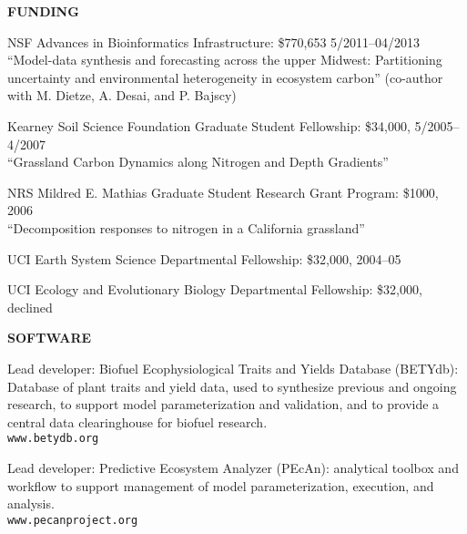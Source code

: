 \documentclass[10pt,twoside]{article}
\begin{document}
\textbf{FUNDING}
\begin{itemize*}
\item NSF Advances in Bioinformatics Infrastructure: \$770,653 5/2011--04/2013\\
``Model-data synthesis and forecasting across the upper Midwest: Partitioning uncertainty and environmental heterogeneity in ecosystem carbon''  (co-author with M. Dietze, A. Desai, and P. Bajscy)
  
\item Kearney Soil Science Foundation Graduate Student Fellowship:  \$34,000, 5/2005--4/2007 \\ 
``Grassland Carbon Dynamics along Nitrogen and Depth Gradients'' 
\item NRS Mildred E. Mathias Graduate Student Research Grant Program: \$1000, 2006 \\
``Decomposition responses to nitrogen in a California grassland'' 
\item UCI Earth System Science Departmental Fellowship: \$32,000, 2004--05
\item UCI Ecology and Evolutionary Biology Departmental Fellowship: \$32,000, declined
\end{itemize*}
\newpage
\textbf{SOFTWARE}
\vspace{-0.5em}
\begin{itemize*}
\item  Lead developer: Biofuel Ecophysiological Traits and Yields Database (BETYdb): Database of plant traits and yield data, used to synthesize previous and ongoing research, to support model parameterization and validation, and to provide a central data clearinghouse for biofuel research. \\\texttt{www.betydb.org}
\item  Lead developer: Predictive Ecosystem Analyzer (PEcAn): analytical toolbox and workflow to support management of model parameterization, execution, and analysis.  \\\texttt{www.pecanproject.org}
\end{itemize*}
\end{document}
